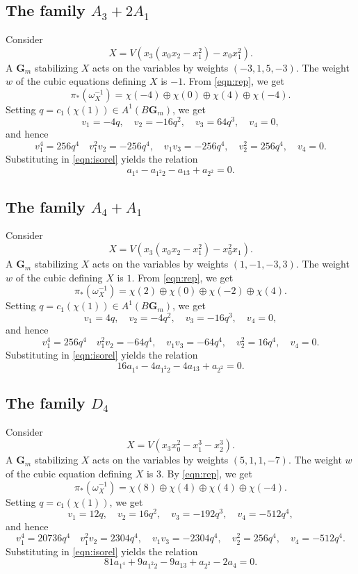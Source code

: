 \documentclass[11pt,reqno, letterpaper]{amsart}
\numberwithin{equation}{section}
\newcommand{\G}{\mathbf G}
\begin{document}
\subsection{The family $A_3 + 2A_1$}
Consider
\[ X = V(x_3(x_0x_2-x_1^2) - x_0x_1^2).\]
A $\G_m$ stabilizing $X$ acts on the variables by weights $(-3,1,5,-3)$.
The weight $w$ of the cubic equations defining $X$ is $-1$.
From \eqref{eqn:rep}, we get
\[ \pi_*\left( \omega_X^{-1} \right) = \chi(-4) \oplus \chi(0) \oplus \chi(4) \oplus \chi(-4).\]
Setting $q = c_1(\chi(1)) \in A^1(B\G_m)$, we get
\[ v_1 = -4q, \quad v_2 = -16q^2, \quad v_3 = 64q^3, \quad v_4 = 0,\]
and hence
\[ v_1^4 = 256q^4 \quad v_1^2v_2 = -256q^4, \quad v_1v_3 = -256q^4, \quad v_2^2 = 256q^4, \quad v_4 = 0.\]
Substituting in \eqref{eqn:isorel} yields the relation
\begin{equation}\label{eqn:iso2}
  a_{1^4} - a_{1^2 2}- a_{13} +  a_{2^2}  = 0.
\end{equation}

\subsection{The family $A_4 + A_1$}
Consider
\[ X = V(x_3(x_0x_2-x_1^2) - x_0^2x_1).\]
A $\G_m$ stabilizing $X$ acts on the variables by weights $(1,-1,-3,3)$.
The weight $w$ of the cubic defining $X$ is $1$.
From \eqref{eqn:rep}, we get
\[ \pi_*\left( \omega_X^{-1} \right) = \chi(2) \oplus \chi(0) \oplus \chi(-2) \oplus \chi(4).\]
Setting $q = c_1(\chi(1)) \in A^1(B\G_m)$, we get
\[ v_1 = 4q, \quad v_2 = -4q^2, \quad v_3 = -16q^3, \quad v_4 = 0,\]
and hence
\[ v_1^4 = 256q^4 \quad v_1^2v_2 = -64q^4, \quad v_1v_3 = -64q^4, \quad v_2^2 = 16q^4, \quad v_4 = 0.\]
Substituting in \eqref{eqn:isorel} yields the relation
\begin{equation}\label{eqn:iso3}
  16a_{1^4} -4a_{1^2 2}- 4a_{13} + a_{2^2}  = 0.
\end{equation}

\subsection{The family $D_4$}
Consider
\[ X = V(x_3x_0^2 - x_1^3-x_2^3).\]
A $\G_m$ stabilizing $X$ acts on the variables by weights $(5,1,1,-7)$.
The weight $w$ of the cubic equation defining $X$ is $3$.
By \eqref{eqn:rep}, we get
\[ \pi_*\left( \omega_X^{-1} \right) = \chi(8) \oplus \chi(4) \oplus \chi(4) \oplus \chi(-4).\]
Setting $q = c_1(\chi(1))$, we get
\[ v_1 = 12q, \quad v_2 = 16q^2, \quad v_3 = -192q^3, \quad v_4 = -512q^4,\]
and hence
\[ v_1^4 = 20736q^4 \quad v_1^2v_2 = 2304q^4, \quad v_1v_3 = -2304q^4, \quad v_2^2 = 256q^4, \quad v_4 = -512q^4.\]
Substituting in \eqref{eqn:isorel} yields the relation
\begin{equation}\label{eqn:iso4}
  81a_{1^4} +9a_{1^2 2}- 9a_{13} +  a_{2^2}-2a_4  = 0.
\end{equation}
\end{document}
